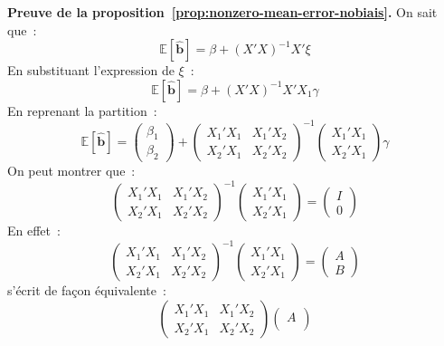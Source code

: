 \documentclass[10pt,a4paper]{article}
\theoremstyle{definition}
\begin{document}
\begin{notes}

  \textbf{Preuve de la proposition~\ref{prop:nonzero-mean-error-nobiais}.} On sait que~:
  \[
    \mathbb E\left[ \hat{\mathbf b} \right] = \beta + (X'X)^{-1}X'\xi
  \]
  En substituant l'expression de $\xi$~:
  \[
    \mathbb E\left[ \hat{\mathbf b} \right] = \beta + (X'X)^{-1}X'X_1\gamma
  \]
  En reprenant la partition~:
  \[
    \mathbb E\left[ \hat{\mathbf b} \right] =
    \begin{pmatrix}
      \beta_1\\ \beta_2
    \end{pmatrix}
    +
    \begin{pmatrix}
      X_1'X_1 & X_1'X_2\\
      X_2'X_1 & X_2'X_2
    \end{pmatrix}^{-1}
    \begin{pmatrix}
      X_1'X_1\\
      X_2'X_1
    \end{pmatrix}\gamma
  \]
  On peut montrer que~:
  \[
\begin{pmatrix}
      X_1'X_1 & X_1'X_2\\
      X_2'X_1 & X_2'X_2
    \end{pmatrix}^{-1}
    \begin{pmatrix}
      X_1'X_1\\
      X_2'X_1
    \end{pmatrix} =
    \begin{pmatrix}
      I\\
      0
    \end{pmatrix}
  \]
  En effet~:
  \[
    \begin{pmatrix}
      X_1'X_1 & X_1'X_2\\
      X_2'X_1 & X_2'X_2
    \end{pmatrix}^{-1}
    \begin{pmatrix}
      X_1'X_1\\
      X_2'X_1
    \end{pmatrix} =
    \begin{pmatrix}
      A\\
      B
    \end{pmatrix}
  \]
  s'écrit de façon équivalente~:
  \[
\begin{pmatrix}
      X_1'X_1 & X_1'X_2\\
      X_2'X_1 & X_2'X_2
\end{pmatrix}
\begin{pmatrix}
      A\\

\end{pmatrix}\]
\end{notes}
\end{document}
